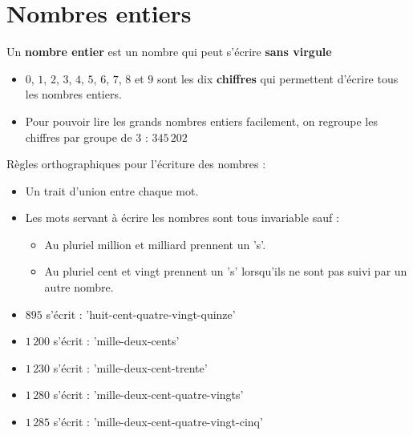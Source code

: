 \documentclass[a4paper,dvipsnames]{article}
\begin{document}
\section{Nombres entiers}

\begin{Def}
Un \textbf{nombre entier} est un nombre qui peut s'écrire \textbf{sans virgule}
\end{Def}

\begin{Rqs}
\begin{itemize}
\item $0$, $1$, $2$, $3$, $4$, $5$, $6$, $7$, $8$ et $9$ sont les dix \textbf{chiffres} qui permettent d'écrire tous les nombres entiers.
\item Pour pouvoir lire les grands nombres entiers facilement, on regroupe les chiffres par groupe de 3 : $345\,202$
\end{itemize}
\end{Rqs}

\begin{Reg}
Règles orthographiques pour l'écriture des nombres :
\begin{itemize}
    \item Un trait d'union entre chaque mot.
    \item Les mots servant à écrire les nombres sont tous invariable sauf :
    \begin{itemize}
        \item Au pluriel million et milliard prennent un 's'.
        \item Au pluriel cent et vingt prennent un 's' lorsqu'ils ne sont pas suivi par un autre nombre.
    \end{itemize}
\end{itemize}
\end{Reg}

\begin{Ex}
\begin{itemize}
\item $895$ s'écrit : 'huit-cent-quatre-vingt-quinze'
\item $1\,200$ s'écrit : 'mille-deux-cents'
\item $1\,230$ s'écrit : 'mille-deux-cent-trente'
\item $1\,280$ s'écrit : 'mille-deux-cent-quatre-vingts'
\item $1\,285$ s'écrit : 'mille-deux-cent-quatre-vingt-cinq'
\end{itemize}
\end{Ex}
\end{document}

